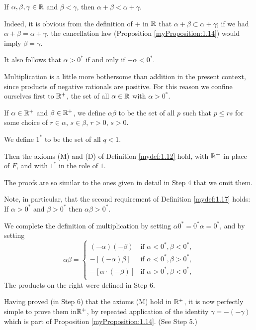 If $\alpha, \beta, \gamma \in {\protect\mathbb R}$ and $\beta < \gamma$, then $\alpha + \beta < \alpha + \gamma$.

Indeed, it is obvious from the definition of $+$ in ${\protect\mathbb R}$ that $\alpha + \beta \subset \alpha + \gamma$;
if we had $\alpha + \beta = \alpha + \gamma$,
the cancellation law (Proposition \ref{myProposition:1.14}) would imply $\beta = \gamma$.

It also follows that $\alpha > 0^*$ if and only if $-\alpha < 0^*$.

\label{chap01_app_Step:6}
Multiplication is a little more bothersome than addition in the present context,
since products of negative rationals are positive.
For this reason we confine ourselves first to ${\protect\mathbb R}^+$,
the set of all $\alpha \in {\protect\mathbb R}$ with $\alpha > 0^*$.

If $\alpha \in {\protect\mathbb R}^+$ and $\beta \in {\protect\mathbb R}^+$,
we define $\alpha\beta$ to be the set of all $p$ such that $p \leq rs$
for some choice of $r \in \alpha$, $s \in \beta$, $r>0$, $s>0$.

We define $1^*$ to be the set of all $q < 1$.

Then the axioms (M) and (D) of Definition \ref{mydef:1.12} hold,
with ${\protect\mathbb R}^+$ in place of $F$, and with $1^*$ in the role of $1$.

The proofs are so similar to the ones given in detail in Step 4 that we omit them.

Note, in particular, that the second requirement of Definition \ref{mydef:1.17} holds:
If $\alpha > 0^*$ and $\beta > 0^*$ then $\alpha\beta > 0^*$.

\label{chap01_app_Step:7}
We complete the definition of multiplication
by setting $\alpha 0^* = 0^* \alpha = 0^*$,
and by setting
\begin{equation*}
    \alpha\beta = \left\{
    \begin{array}{ll}
        (-\alpha)(-\beta)      & \text{if } \alpha < 0^*, \beta < 0^*, \\
        -[(-\alpha)\beta]      & \text{if } \alpha < 0^*, \beta > 0^*, \\
        -[\alpha\cdot(-\beta)] & \text{if } \alpha > 0^*, \beta < 0^*, \\
    \end{array}
    \right.
\end{equation*}
The products on the right were defined in Step 6.

Having proved (in Step 6) that the axioms (M) hold in ${\protect\mathbb R}^+$,
it is now perfectly simple to prove them in${\protect\mathbb R}^+$,
by repeated application of the identity $\gamma = -(-\gamma)$
which is part of Proposition \ref{myProposition:1.14}. (See Step 5.)

